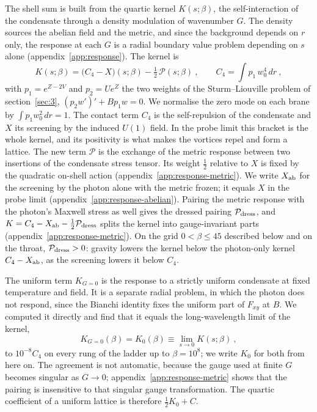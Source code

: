 The shell sum is built from the quartic kernel $K(s;\beta)$, the self-interaction
of the condensate through a density modulation of wavenumber $G$. The
density sources the abelian field and the metric, and since the background
depends on $r$ only, the response at each $G$ is a radial boundary value
problem depending on $s$ alone (appendix~\ref{app:response}). The kernel is
\begin{equation}
K(s;\beta) = \big(C_4 - X\big)(s;\beta) - \tfrac12\,\mathcal{P}(s;\beta)~, \qquad
C_4 = \int p_1\,w_0^4\,dr~,
\end{equation}
with $p_1 = e^{Z-2V}$ and $p_2 = Ue^Z$ the two weights of the
Sturm--Liouville problem of section~\ref{sec:3}, $(p_2 w')' + Bp_1 w = 0$.
We normalise the zero mode on each brane by $\int p_1 w_0^2\,dr = 1$. The
contact term $C_4$ is the self-repulsion of the condensate and $X$ its
screening by the induced $U(1)$ field. In the probe limit this bracket is
the whole kernel, and its positivity is what makes the vortices repel and
form a lattice. The new term $\mathcal{P}$ is the exchange of the metric
response between two insertions of the condensate stress tensor. Its
weight $\tfrac12$ relative to $X$ is fixed by the quadratic on-shell action
(appendix~\ref{app:response-metric}). We write $X_{\rm ab}$ for the
screening by the photon alone with the metric frozen; it equals $X$ in the
probe limit (appendix~\ref{app:response-abelian}). Pairing the metric
response with the photon's Maxwell stress as well gives the dressed
pairing $\mathcal{P}_{\rm dress}$, and $K = C_4 - X_{\rm ab} -
\tfrac12\mathcal{P}_{\rm dress}$ splits the kernel into gauge-invariant
parts (appendix~\ref{app:response-metric}). On the grid
$0 < \beta \le 45$ described below and on the throat,
$\mathcal{P}_{\rm dress} > 0$: gravity lowers
the kernel below the photon-only kernel $C_4 - X_{\rm ab}$, as the
screening lowers it below $C_4$.

The uniform term $K_{G=0}$ is the response to a strictly uniform
condensate at fixed temperature and field. It is a separate radial problem,
in which the photon does not respond, since the Bianchi identity fixes the
uniform part of $F_{xy}$ at $B$. We computed it directly and find that it
equals the long-wavelength limit of the kernel,
\begin{equation}
K_{G=0}(\beta) = K_0(\beta) \equiv \lim_{s\to0}K(s;\beta)~,
\end{equation}
to $10^{-8}C_4$ on every rung of the ladder up to $\beta = 10^8$; we write $K_0$ for both from here on. The agreement is not
automatic, because the gauge used at finite $G$ becomes singular as
$G \to 0$; appendix~\ref{app:response-metric} shows that the pairing is
insensitive to that singular gauge transformation. The quartic coefficient of a uniform lattice is
therefore $\tfrac12K_0 + C$.

